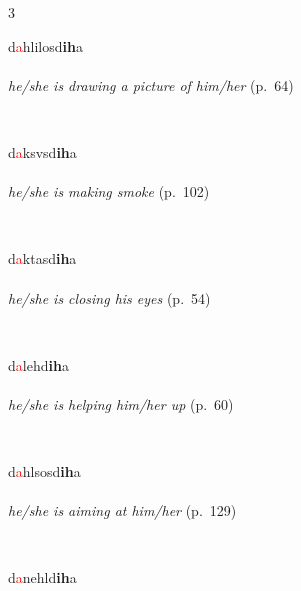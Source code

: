 \documentclass[oneside,openany]{book}%
\begin{document}
\begin{multicols}{3}
\begin{minipage}[t]{\linewidth}
\raggedright\noindent d\textcolor{Red}{a}hlilosd\textbf{ih}a\\
\\
\noindent \textit{he/she is drawing a picture of him/her} (p.~64)
\end{minipage}\\[1em]%
\begin{minipage}[t]{\linewidth}
\raggedright\noindent d\textcolor{Red}{a}ksvsd\textbf{ih}a\\
\\
\noindent \textit{he/she is making smoke} (p.~102)
\end{minipage}\\[1em]%
\begin{minipage}[t]{\linewidth}
\raggedright\noindent d\textcolor{Red}{a}ktasd\textbf{ih}a\\
\\
\noindent \textit{he/she is closing his eyes} (p.~54)
\end{minipage}\\[1em]%
\begin{minipage}[t]{\linewidth}
\raggedright\noindent d\textcolor{Red}{a}lehd\textbf{ih}a\\
\\
\noindent \textit{he/she is helping him/her up} (p.~60)
\end{minipage}\\[1em]%
\begin{minipage}[t]{\linewidth}
\raggedright\noindent d\textcolor{Red}{a}hlsosd\textbf{ih}a\\
\\
\noindent \textit{he/she is aiming at him/her} (p.~129)
\end{minipage}\\[1em]%
\begin{minipage}[t]{\linewidth}
\raggedright\noindent d\textcolor{Red}{a}nehld\textbf{ih}a\\
\\

\end{minipage}
\end{multicols}
\end{document}
